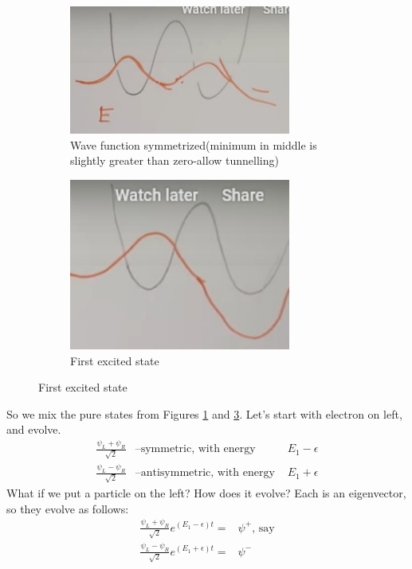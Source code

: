 \documentclass[]{article}
\begin{document}
\begin{figure}[H]
	\caption{Wave functions for Figure \ref{fig:double:well}}
	\begin{subfigure}{0.45\textwidth}
			\caption{Wave function symmetrized(minimum in middle is slightly greater than zero-allow tunnelling)}\label{fig:double:well:symmetrized}
			\includegraphics[width=0.8\textwidth]{particle_mixed_symmetrized}
	\end{subfigure}
	\begin{subfigure}{0.45\textwidth}
		\caption{First excited state}\label{fig:double:well:1st}
		\includegraphics[width=0.8\textwidth]{particle_mixed_1st_excited}
	\end{subfigure}
\end{figure}


So we mix the pure states from Figures \ref{fig:double:well:symmetrized} and \ref{fig:double:well:1st}. Let's start with electron on left, and evolve.
\begin{align*}
	\frac{\psi_L+\psi_R}{\sqrt{2}}& \text{--symmetric, with energy }& E_1-\epsilon\\
	\frac{\psi_L-\psi_R}{\sqrt{2}}& \text{--antisymmetric, with energy }& E_1+\epsilon
\end{align*}
What if we put a particle on the left? How does it evolve? Each is an eigenvector, so they evolve as follows:
\begin{align*}
	\frac{\psi_L+\psi_R}{\sqrt{2}} e^{(E_1-\epsilon)t}=&\psi^+ \text{, say}\\
	\frac{\psi_L-\psi_R}{\sqrt{2}}e^{(E_1+\epsilon)t}=&\psi^-
\end{align*}
\end{document}
